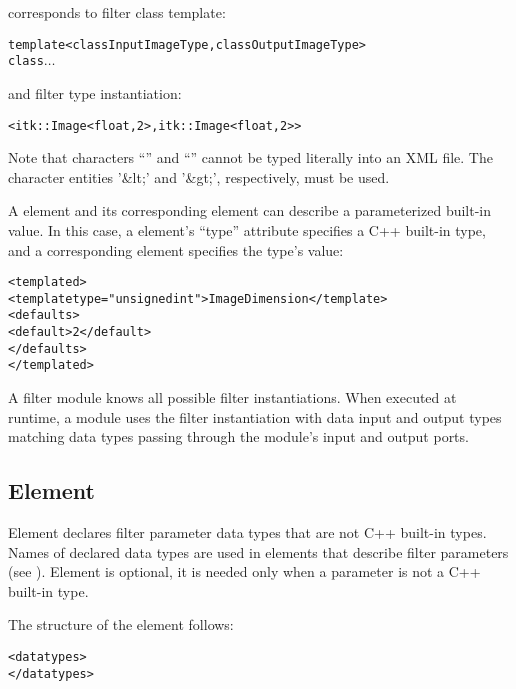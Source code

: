 corresponds to filter class template:

\begin{alltt}
  template <class InputImageType, class OutputImageType>
  class \(\ldots\)
\end{alltt}

and filter type instantiation:

\begin{alltt}
  <itk::Image<float,2>,itk::Image<float,2> >
\end{alltt}

Note that characters ``\la'' and ``\ra'' cannot be typed literally into an
XML file. The character entities '\&lt;' and '\&gt;', respectively, 
must be used.

A  element and its corresponding
 element can describe a parameterized built-in 
value.  In this case, a  element's ``type''
attribute specifies a C++ built-in type, and a corresponding
 element specifies the type's value:

\begin{alltt}
  <templated>
    <template type="unsigned int">ImageDimension</template>
    \velide
    <defaults>
      <default>2</default>
      \velide
    </defaults>
  </templated>
\end{alltt}

A \sr{} filter module knows all possible filter instantiations.  When
executed at runtime, a module uses the filter instantiation with data
input and output types matching data types passing through the
module's input and output ports.

\subsection{Element }

Element  declares filter parameter data types
that are not C++ built-in  types.  Names of declared data types are
used in  elements that describe filter
parameters (see ).  Element
 is optional, it is needed only when a
parameter is not a C++ built-in type.

The structure of the  element follows:

\begin{alltt}
  <datatypes>
    \velide
    \velide  
  </datatypes>
\end{alltt}

